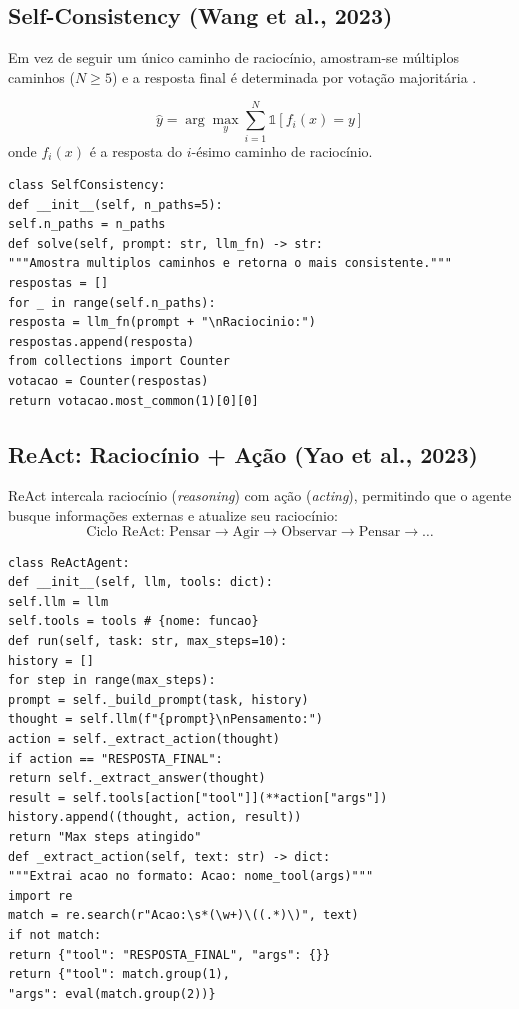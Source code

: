 \subsection{Self-Consistency (Wang et al., 2023)}
\begin{definicao}
Em vez de seguir um único caminho de raciocínio, amostram-se múltiplos
caminhos ($N \geq 5$) e a resposta final é determinada por votação
majoritária \cite{wang2023selfconsistency}.
\end{definicao}
\[\hat{y} = \arg\max_y \sum_{i=1}^N \mathds{1}[f_i(x) = y]
\]
onde $f_i(x)$ é a resposta do $i$-ésimo caminho de raciocínio.
\begin{lstlisting}[style=pythonstyle]
class SelfConsistency:
def __init__(self, n_paths=5):
self.n_paths = n_paths
def solve(self, prompt: str, llm_fn) -> str:
"""Amostra multiplos caminhos e retorna o mais consistente."""
respostas = []
for _ in range(self.n_paths):
resposta = llm_fn(prompt + "\nRaciocinio:")
respostas.append(resposta)
from collections import Counter
votacao = Counter(respostas)
return votacao.most_common(1)[0][0]
\end{lstlisting}
\subsection{ReAct: Raciocínio + Ação (Yao et al., 2023)}
ReAct \cite{yao2023react} intercala raciocínio (\textit{reasoning}) com
ação (\textit{acting}), permitindo que o agente busque informações externas
e atualize seu raciocínio:
\[\text{Ciclo ReAct: } \text{Pensar} \to \text{Agir} \to \text{Observar} \to \text{Pensar} \to \ldots
\]
\begin{lstlisting}[style=pythonstyle]
class ReActAgent:
def __init__(self, llm, tools: dict):
self.llm = llm
self.tools = tools # {nome: funcao}
def run(self, task: str, max_steps=10):
history = []
for step in range(max_steps):
prompt = self._build_prompt(task, history)
thought = self.llm(f"{prompt}\nPensamento:")
action = self._extract_action(thought)
if action == "RESPOSTA_FINAL":
return self._extract_answer(thought)
result = self.tools[action["tool"]](**action["args"])
history.append((thought, action, result))
return "Max steps atingido"
def _extract_action(self, text: str) -> dict:
"""Extrai acao no formato: Acao: nome_tool(args)"""
import re
match = re.search(r"Acao:\s*(\w+)\((.*)\)", text)
if not match:
return {"tool": "RESPOSTA_FINAL", "args": {}}
return {"tool": match.group(1),
"args": eval(match.group(2))}
\end{lstlisting}
